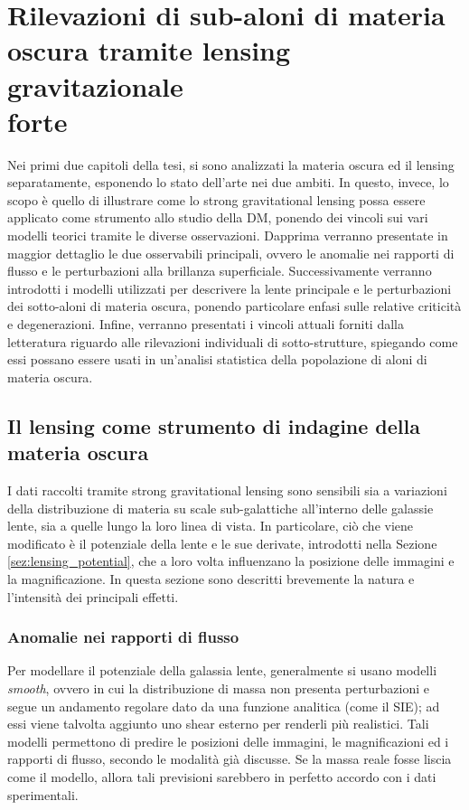 \chapter[Rilevazioni di sub-aloni di DM tramite SGL]{Rilevazioni di sub-aloni di materia \\oscura tramite lensing gravitazionale \\forte}
\label{cap:SGL+DM}
Nei primi due capitoli della tesi, si sono analizzati la materia oscura ed il lensing separatamente, esponendo lo stato dell'arte nei due ambiti. In questo, invece, lo scopo è quello di illustrare come lo strong gravitational lensing possa essere applicato come strumento allo studio della DM, ponendo dei vincoli sui vari modelli teorici tramite le diverse osservazioni. Dapprima verranno presentate in maggior dettaglio le due osservabili principali, ovvero le anomalie nei rapporti di flusso e le perturbazioni alla brillanza superficiale. Successivamente verranno introdotti i modelli utilizzati per descrivere la lente principale e le perturbazioni dei sotto-aloni di materia oscura, ponendo particolare enfasi sulle relative criticità e degenerazioni. Infine, verranno presentati i vincoli attuali forniti dalla letteratura riguardo alle rilevazioni individuali di sotto-strutture, spiegando come essi possano essere usati in un'analisi statistica della popolazione di aloni di materia oscura.

\section[Il lensing come strumento di indagine della materia oscura]{Il lensing come strumento di indagine della \\ materia oscura}
I dati raccolti tramite strong gravitational lensing sono sensibili sia a variazioni della distribuzione di materia su scale sub-galattiche all'interno delle galassie lente, sia a quelle lungo la loro linea di vista.
In particolare, ciò che viene modificato è il potenziale della lente e le sue derivate, introdotti nella Sezione \ref{sez:lensing_potential}, che a loro volta influenzano la posizione delle immagini e la magnificazione.
In questa sezione sono descritti brevemente la natura e l'intensità dei principali effetti.

\subsection{Anomalie nei rapporti di flusso}
\label{sez:flux_anomalies}
Per modellare il potenziale della galassia lente, generalmente si usano modelli \emph{smooth}, ovvero in cui la distribuzione di massa non presenta perturbazioni e segue un andamento regolare dato da una funzione analitica (come il SIE); ad essi viene talvolta aggiunto uno shear esterno per renderli più realistici. Tali modelli permettono di predire le posizioni delle immagini, le magnificazioni ed i rapporti di flusso, secondo le modalità già discusse. Se la massa reale fosse liscia come il modello, allora tali previsioni sarebbero in perfetto accordo con i dati sperimentali. 

